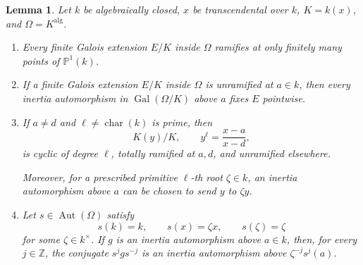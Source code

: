 \documentclass[10pt,a4paper]{amsart}
\newtheorem{lemma}[theorem]{Lemma}
\theoremstyle{definition}
\newcommand{\Z}{\mathbb Z}
\newcommand{\alg}{\mathrm{alg}}
\DeclareMathOperator{\Gal}{Gal}
\DeclareMathOperator{\Aut}{Aut}
\DeclareMathOperator{\charac}{char}
\begin{document}
\begin{lemma}\label{a:lem:ramification}
Let $k$ be algebraically closed, $x$ be transcendental over $k$, $K=k(x)$, and $\Omega=K^{\alg}$.
\begin{enumerate}[label=\textup{(\roman*)}]
\item Every finite Galois extension $E/K$ inside $\Omega$ ramifies at only finitely many points of $\mathbb P^1(k)$.
\item If a finite Galois extension $E/K$ inside $\Omega$
is unramified at $a\in k$, then every inertia automorphism
in $\Gal(\Omega/K)$ above $a$ fixes $E$ pointwise.
\item If $a\neq d$ and $\ell\neq\charac(k)$ is prime, then
\[
 K(y)/K,\qquad y^\ell=\frac{x-a}{x-d},
\]
is cyclic of degree $\ell$, totally ramified at $a,d$, and unramified elsewhere.

Moreover, for a prescribed primitive $\ell$-th root $\zeta\in k$, an inertia automorphism above $a$ can be chosen to send $y$ to $\zeta y$.

\item Let $s\in\Aut(\Omega)$ satisfy
\[
s(k)=k,\qquad s(x)=\zeta x, \qquad s(\zeta)=\zeta
\]
 for some
$\zeta\in k^\times$.
If $g$ is an inertia automorphism above $a\in k$,
then, for every $j\in\Z$, the conjugate $s^jgs^{-j}$
is an inertia automorphism above $\zeta^{-j}s^j(a)$.
\end{enumerate}
\end{lemma}
\end{document}
